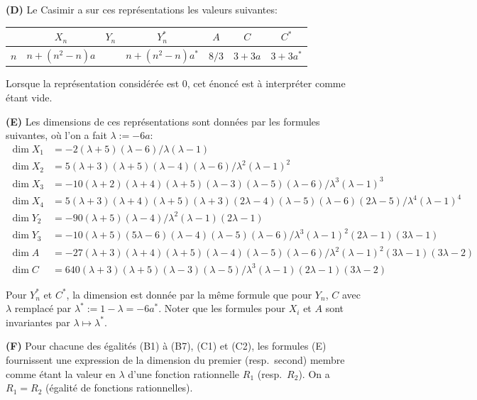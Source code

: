 \documentclass[11pt,a4paper]{article}
\begin{document}
\medskip
\noindent\textbf{(D)} Le Casimir a sur ces repr\'esentations les valeurs suivantes:

\begin{center}
\begin{tabular}{c|cccccc}
 & $X_n$ & $Y_n$ & $Y_n^*$ & $A$ & $C$ & $C^*$ \\
\hline
$n$ & $n + (n^2 - n)a$ & & $n + (n^2 - n)a^*$ & $8/3$ & $3 + 3a$ & $3 + 3a^*$
\end{tabular}
\end{center}

Lorsque la repr\'esentation consid\'er\'ee est $0$, cet \'enonc\'e est \`a interpr\'eter comme \'etant vide.

\medskip
\noindent\textbf{(E)} Les dimensions de ces repr\'esentations sont donn\'ees par les formules suivantes, o\`u l'on a fait $\lambda := -6a$:
\begin{align*}
\dim X_1 &= -2(\lambda + 5)(\lambda - 6)/\lambda(\lambda - 1) \\
\dim X_2 &= 5(\lambda + 3)(\lambda + 5)(\lambda - 4)(\lambda - 6)/\lambda^2(\lambda - 1)^2 \\
\dim X_3 &= -10(\lambda + 2)(\lambda + 4)(\lambda + 5)(\lambda - 3)(\lambda - 5)(\lambda - 6)/\lambda^3(\lambda - 1)^3 \\
\dim X_4 &= 5(\lambda + 3)(\lambda + 4)(\lambda + 5)(\lambda + 3)(2\lambda - 4)(\lambda - 5)(\lambda - 6)(2\lambda - 5)/\lambda^4(\lambda - 1)^4 \\
\dim Y_2 &= -90(\lambda + 5)(\lambda - 4)/\lambda^2(\lambda - 1)(2\lambda - 1) \\
\dim Y_3 &= -10(\lambda + 5)(5\lambda - 6)(\lambda - 4)(\lambda - 5)(\lambda - 6)/\lambda^3(\lambda - 1)^2(2\lambda - 1)(3\lambda - 1) \\
\dim A &= -27(\lambda + 3)(\lambda + 4)(\lambda + 5)(\lambda - 4)(\lambda - 5)(\lambda - 6)/\lambda^2(\lambda - 1)^2(3\lambda - 1)(3\lambda - 2) \\
\dim C &= 640(\lambda + 3)(\lambda + 5)(\lambda - 3)(\lambda - 5)/\lambda^3(\lambda - 1)(2\lambda - 1)(3\lambda - 2)
\end{align*}

Pour $Y_n^*$ et $C^*$, la dimension est donn\'ee par la m\^eme formule que pour $Y_n$, $C$ avec $\lambda$ remplac\'e par $\lambda^* := 1 - \lambda = -6a^*$. Noter que les formules pour $X_i$ et $A$ sont invariantes par $\lambda \mapsto \lambda^*$.

\medskip
\noindent\textbf{(F)} Pour chacune des \'egalit\'es (B1) \`a (B7), (C1) et (C2), les formules (E) fournissent une expression de la dimension du premier (resp.~second) membre comme \'etant la valeur en $\lambda$ d'une fonction rationnelle $R_1$ (resp.~$R_2$). On a $R_1 = R_2$ (\'egalit\'e de fonctions rationnelles).
\end{document}
